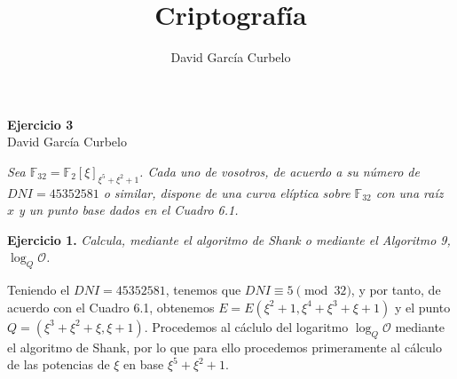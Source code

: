 \documentclass[fleqn]{article}
\author{David García Curbelo}
\title{Criptografía}
\def\F{\mathds{F}}
\begin{document}
    \begin{center}
        \LARGE{\textbf{Ejercicio 3}} \\
        \Large{David García Curbelo} 
    \end{center}

    \vspace{1cm}     

    \textit{Sea $\F_{32} = \F_2 [\xi]_{\xi^5 + \xi^2 + 1}$. Cada uno de vosotros, de acuerdo a su número de $DNI = 45352581$ o similar,
            dispone de una curva elíptica sobre $\F_{32}$ con una raíz $x$ y un punto base dados en el Cuadro 6.1.}

    \vspace{0.5cm}   

    \textbf{Ejercicio 1. }\textit{Calcula, mediante el algoritmo de Shank o mediante el Algoritmo 9, $\log_Q \mathcal{O}$.}
    \vspace{0.5cm}

    Teniendo el $DNI = 45352581$, tenemos que $DNI \equiv 5 \pmod{32}$, y por tanto, de acuerdo con el Cuadro 6.1, obtenemos 
    $E = E(\xi^2 + 1, \xi^4 + \xi^3 + \xi + 1)$ y  el punto $Q = (\xi^3 + \xi^2 + \xi, \xi + 1)$. Procedemos al cáclulo del logaritmo 
    $\log_Q \mathcal{O}$ mediante el algoritmo de Shank, por lo que para ello procedemos primeramente al cálculo de las potencias de
    $\xi$ en base $\xi^5 + \xi^2 + 1$.
\end{document}
